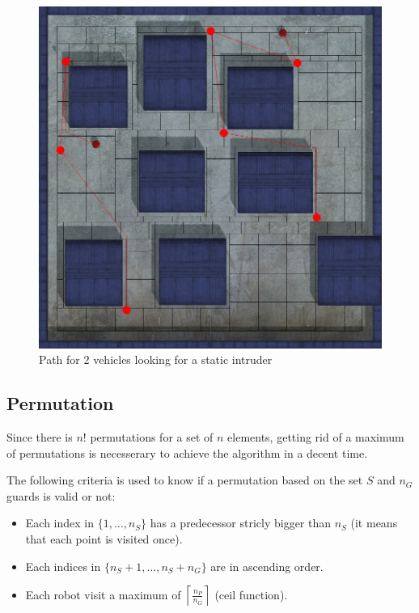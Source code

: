 \begin{figure}[h!t]
	\begin{center}
	\includegraphics[width=\linewidth,natwidth=824,natheight=823]{fig/dynamicPath.jpg}
	\end{center}
	\caption{Path for $2$ vehicles looking for a static intruder}
	\label{dynamicPath}
\end{figure}

\subsection{Permutation}

Since there is $n!$ permutations for a set of $n$ elements, getting rid of a maximum of permutations is necesserary to achieve the algorithm in a decent time. 

\begin{criteria}
 The following criteria is used to know if a permutation based on the set $S$ and $n_G$ guards is valid or not:
 \begin{itemize}
  \item Each index in $\{1,\hdots,n_S\}$ has a predecessor stricly bigger than $n_S$ (it means that each point is visited once).
  \item Each indices in $\{n_S+1,\hdots,n_S+n_G\}$ are in ascending order.
  \item Each robot visit a maximum of $\left \lceil{\frac{n_P}{n_G}}\right \rceil$ (ceil function).
 \end{itemize}
 \label{permCriteria}
\end{criteria}

